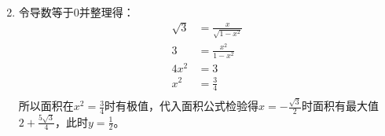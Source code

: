 \documentclass[answers]{exam}
\begin{document}
\begin{questions}
\begin{solution}
\begin{enumerate}[label=\zhnum*、]
\begin{align*}
			      \end{align*}
			\item 令导数等于$0$并整理得：
			      \begin{align*}
				      \sqrt{3} & = \frac{x}{\sqrt{1-x^2}} \\
				      3        & = \frac{x^2}{1-x^2}      \\
				      4x^2     & = 3                      \\
				      x^2      & = \frac34                \\
			      \end{align*}
				  所以面积在$x^2 = \frac34$时有极值，代入面积公式检验得$x=-\frac{\sqrt{3}}{2}$时面积有最大值$2 +
				  \frac{5\sqrt{3}}{4}$，此时$y=\frac12$。
		\end{enumerate}
	\end{solution}

\end{questions}
\end{document}

